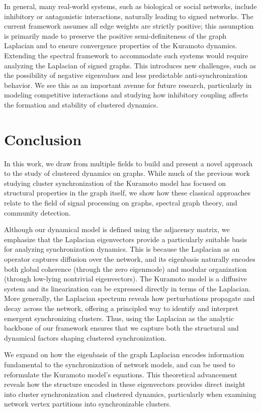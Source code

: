 \documentclass[%
 aip,
 amsmath,amssymb,
preprint,
reprint, onecolumn %
]{revtex4-1}
\begin{document}
In general, many real-world systems, such as biological or social networks, include inhibitory or antagonistic interactions, naturally leading to signed networks. The current framework assumes all edge weights are strictly positive; this assumption is primarily made to preserve the positive semi-definiteness of the graph Laplacian and to ensure convergence properties of the Kuramoto dynamics. Extending the spectral framework to accommodate such systems would require analyzing the Laplacian of signed graphs. This introduces new challenges, such as the possibility of negative eigenvalues and less predictable anti-synchronization behavior. We see this as an important avenue for future research, particularly in modeling competitive interactions and studying how inhibitory coupling affects the formation and stability of clustered dynamics.
% 

\section{Conclusion}

In this work, we draw from multiple fields to build and present a novel approach to the study of clustered dynamics on graphs.
While much of the previous work studying cluster synchronization of the Kuramoto model has focused on structural properties in the graph itself, we show how these classical approaches relate to the field of signal processing on graphs, spectral graph theory, and community detection. 

Although our dynamical model is defined using the adjacency matrix, we emphasize that the Laplacian eigenvectors provide a particularly suitable basis for analyzing synchronization dynamics. This is because the Laplacian as an operator captures diffusion over the network, and its eigenbasis naturally encodes both global coherence (through the zero eigenmode) and modular organization (through low-lying nontrivial eigenvectors). The Kuramoto model is a diffusive system and its linearization can be expressed directly in terms of the Laplacian. More generally, the Laplacian spectrum reveals how perturbations propagate and decay across the network, offering a principled way to identify and interpret emergent synchronizing clusters. Thus, using the Laplacian as the analytic backbone of our framework ensures that we capture both the structural and dynamical factors shaping clustered synchronization.

We expand on how the eigenbasis of the graph Laplacian encodes information fundamental to the synchronization of network models, and can be used to reformulate the Kuramoto model's equations. This theoretical advancement reveals how the structure encoded in these eigenvectors provides direct insight into cluster synchronization and clustered dynamics, particularly when examining network vertex partitions into synchronizable clusters.
\end{document}

